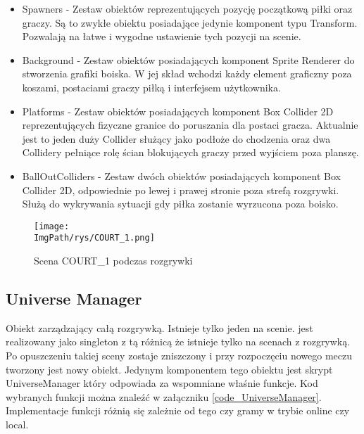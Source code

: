 \documentclass[a4paper,12pt,twoside,openany]{report}
\newcommand{\ImgPath}{.}
\begin{document}
\begin{itemize}
    \item Spawners - Zestaw obiektów reprezentujących pozycję początkową piłki oraz graczy. Są to zwykłe obiektu posiadające jedynie komponent typu Transform. Pozwalają na łatwe i wygodne ustawienie tych pozycji na scenie.
    \item Background - Zestaw obiektów posiadających komponent Sprite Renderer do stworzenia grafiki boiska. W jej skład wchodzi każdy element graficzny poza koszami, postaciami graczy piłką i interfejsem użytkownika.
    \item Platforms - Zestaw obiektów posiadających komponent Box Collider 2D reprezentujących fizyczne granice do poruszania dla postaci gracza. Aktualnie jest to jeden duży Collider służący jako podłoże do chodzenia oraz dwa Collidery pełniące rolę ścian blokujących graczy przed wyjściem poza planszę.
    \item BallOutColliders - Zestaw dwóch obiektów posiadających komponent Box Collider 2D, odpowiednie po lewej i prawej stronie poza strefą rozgrywki. Służą do wykrywania sytuacji gdy piłka zostanie wyrzucona poza boisko.
\end{itemize}

\begin{figure}[H]
	\begin{center}
\centering
\texttt{[image: \\ImgPath/rys/COURT\_1.png]}
\end{center}
	\caption{Scena COURT\_1 podczas rozgrywki}
	\label{COURT_1}
\end{figure}

\subsection{Universe Manager}
\label{universe_manager}
Obiekt zarządzający całą rozgrywką. Istnieje tylko jeden na scenie. jest realizowany jako singleton z tą różnicą że istnieje tylko na scenach z rozgrywką. Po opuszczeniu takiej sceny zostaje zniszczony i przy rozpoczęciu nowego meczu tworzony jest nowy obiekt. Jedynym komponentem tego obiektu jest skrypt UniverseManager który odpowiada za wspomniane właśnie funkcje. Kod wybranych funkcji można znaleźć w załączniku \ref{code_UniverseManager}. Implementacje funkcji różnią się zależnie od tego czy gramy w trybie online czy local.
\end{document}
